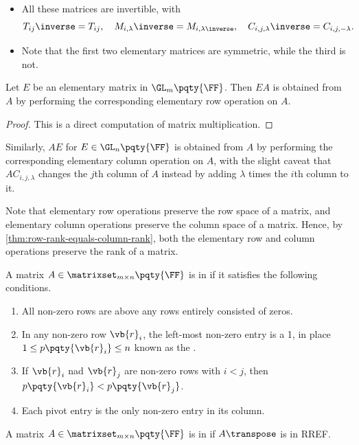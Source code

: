 \begin{remarks}
    \begin{itemize}
        \item All these matrices are invertible, with
        \[
            T_{ij}\inverse = T_{ij}, \quad M_{i, \lambda}\inverse = M_{i, \lambda\inverse}, \quad C_{i, j, \lambda}\inverse = C_{i, j, -\lambda}.
        \]
        \item Note that the first two elementary matrices are symmetric, while the third is not.
    \end{itemize}
\end{remarks}

\begin{lemma}
    Let \(E\) be an elementary matrix in \(\GL_m\pqty{\FF}\). Then \(EA\) is obtained from \(A\) by performing the corresponding elementary row operation on \(A\).
\end{lemma}

\begin{proof}
    This is a direct computation of matrix multiplication.
\end{proof}

Similarly, \(AE\) for \(E \in \GL_n\pqty{\FF}\) is obtained from \(A\) by performing the corresponding elementary column operation on \(A\), with the slight caveat that \(A C_{i, j, \lambda}\) changes the \(j\)th column of \(A\) instead by adding \(\lambda\) times the \(i\)th column to it.

Note that elementary row operations preserve the row space of a matrix, and elementary column operations preserve the column space of a matrix. Hence, by \autoref{thm:row-rank-equals-column-rank}, both the elementary row and column operations preserve the rank of a matrix.

\begin{definition}
    A matrix \(A \in \matrixset_{m \times n} \pqty{\FF}\) is in  if it satisfies the following conditions.
    \begin{enumerate}
        \item All non-zero rows are above any rows entirely consisted of zeros.
        \item In any non-zero row \(\vb{r}_i\), the left-most non-zero entry is a 1, in place \(1 \leq p\pqty{\vb{r}_i} \leq n\) known as the .
        \item If \(\vb{r}_i\) nad \(\vb{r}_j\) are non-zero rows with \(i < j\), then \(p\pqty{\vb{r}_i} < p\pqty{\vb{r}_j}\).
        \item Each pivot entry is the only non-zero entry in its column.
    \end{enumerate}

    A matrix \(A \in \matrixset_{m \times n} \pqty{\FF}\) is in  if \(A\transpose\) is in RREF.
\end{definition}

